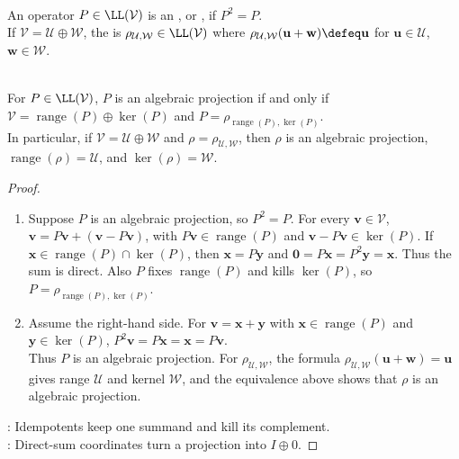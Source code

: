 \begin{definition} \label{def:projection-onto-subspace-along-complement} \\
An operator $P\in\LL(\mathcal{V})$ is an , or , if $P^2=P$.\\
If $\mathcal{V}=\mathcal{U}\oplus\mathcal{W}$, the  is $\rho_{\mathcal{U},\mathcal{W}}\in\LL(\mathcal{V})$ where $\rho_{\mathcal{U},\mathcal{W}}(\mathbf{u}+\mathbf{w})\defeq\mathbf{u}$ for $\mathbf{u}\in\mathcal{U}$, $\mathbf{w}\in\mathcal{W}$.
\end{definition}

\begin{proposition} \label{prop:algebraic-projection-range-kernel-idempotent} \\
For $P\in\LL(\mathcal{V})$, $P$ is an algebraic projection if and only if $\mathcal{V}=\operatorname{range}(P)\oplus\ker(P)$ and $P=\rho_{\operatorname{range}(P),\ker(P)}$.\\
In particular, if $\mathcal{V}=\mathcal{U}\oplus\mathcal{W}$ and $\rho=\rho_{\mathcal{U},\mathcal{W}}$, then $\rho$ is an algebraic projection, $\operatorname{range}(\rho)=\mathcal{U}$, and $\ker(\rho)=\mathcal{W}$.
\begin{proof}
\begin{enumerate}[label=\roman*.]
\setlength{\itemsep}{0pt}
\item[$(\Rightarrow)$] Suppose $P$ is an algebraic projection, so $P^2=P$. For every $\mathbf{v}\in\mathcal{V}$, $\mathbf{v}=P\mathbf{v}+(\mathbf{v}-P\mathbf{v})$, with $P\mathbf{v}\in\operatorname{range}(P)$ and $\mathbf{v}-P\mathbf{v}\in\ker(P)$. If $\mathbf{x}\in\operatorname{range}(P)\cap\ker(P)$, then $\mathbf{x}=P\mathbf{y}$ and $\mathbf{0}=P\mathbf{x}=P^2\mathbf{y}=\mathbf{x}$. Thus the sum is direct. Also $P$ fixes $\operatorname{range}(P)$ and kills $\ker(P)$, so $P=\rho_{\operatorname{range}(P),\ker(P)}$.
\item[$(\Leftarrow)$] Assume the right-hand side. For $\mathbf{v}=\mathbf{x}+\mathbf{y}$ with $\mathbf{x}\in\operatorname{range}(P)$ and $\mathbf{y}\in\ker(P)$, $P^2\mathbf{v}=P\mathbf{x}=\mathbf{x}=P\mathbf{v}$.\\
Thus $P$ is an algebraic projection. For $\rho_{\mathcal{U},\mathcal{W}}$, the formula $\rho_{\mathcal{U},\mathcal{W}}(\mathbf{u}+\mathbf{w})=\mathbf{u}$ gives range $\mathcal{U}$ and kernel $\mathcal{W}$, and the equivalence above shows that $\rho$ is an algebraic projection.
\end{enumerate}
: Idempotents keep one summand and kill its complement.\\
: Direct-sum coordinates turn a projection into $I\oplus0$.
\end{proof}
\end{proposition}

